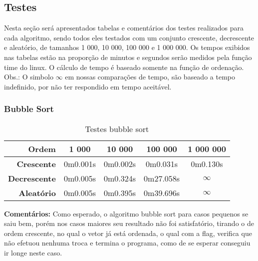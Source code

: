 \documentclass[
	12pt,				%
	oneside,			%
	a4paper,			%
	english,			%
	brazil,				%
	]{article}
\begin{document}
\subsection{Testes}
Nesta seção será apresentados tabelas e comentários dos testes realizados para cada algoritmo, sendo todos eles testados com um conjunto crescente, decrescente e aleatório, de tamanhos
1 000, 10 000, 100 000 e 1 000 000. Os tempos exibidos nas tabelas estão na proporção de minutos e segundos serão medidos pela função time do linux. O cálculo de tempo
é baseado somente na função de ordenação. \\ Obs.: O simbolo $\infty$ em nossas comparações de tempo, são baseado a tempo indefinido, por não ter respondido em tempo aceitável.

\subsubsection{Bubble Sort}
\begin{table}[H]
\centering
\begin{tabular}{|r|c|c|c|c|}
\cline{1-5} 
\textbf{Ordem} & \textbf{1 000} & \textbf{10 000} & \textbf{100 000} & \textbf{1 000 000}\\
 \hline
 \textbf{Crescente} & 0m0.001s & 0m0.002s & 0m0.031s & 0m0.130s \\
 \hline
 \textbf{Decrescente} & 0m0.005s & 0m0.324s & 0m27.058s & $\infty$ \\
 \hline
 \textbf{Aleat{\'o}rio} & 0m0.005s & 0m0.395s & 0m39.696s & $\infty$ \\
 \hline
\end{tabular} 
\caption{Testes bubble sort}
\end{table}
\indent \textbf{Comentários:} Como esperado, o algoritmo bubble sort para casos pequenos se saiu bem, porém nos casos maiores seu resultado não foi satisfatório, tirando
o de ordem crescente, no qual o vetor já está ordenada, o qual com a flag, verifica que não efetuou nenhuma troca e termina o programa, como de se esperar conseguiu ir longe neste caso.
\end{document}
